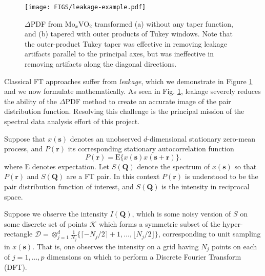 
\begin{figure} 
\begin{center}
    \texttt{[image: FIGS/leakage-example.pdf]} 
\end{center}
\caption{$\Delta$PDF from Mo$_x$VO$_2$ transformed (a) without any taper function,
and (b) tapered with outer products of Tukey windows. Note that the outer-product
Tukey taper was effective in removing leakage artifacts parallel to the principal
axes, but was ineffective in removing artifacts along the diagonal directions.
\label{fig:tapered}} 
\end{figure}

Classical FT approaches suffer from \textit{leakage}, which we demonstrate in Figure
\ref{fig:tapered} and we now formulate mathematically. As seen in Fig.
\ref{fig:tapered}, leakage severely reduces the ability of the $\Delta$PDF method to
create an accurate image of the pair distribution function. Resolving this challenge
is the principal mission of the spectral data analysis effort of this project. 

Suppose that $x(\mathbf{s})$ denotes an unobserved $d$-dimensional stationary
zero-mean process, and $P(\mathbf{r})$ its corresponding stationary autocorrelation
function 
\begin{equation}
P(\mathbf{r}) = \mbox{E} \{ x(\mathbf{s}) x(\mathbf{s} + \mathbf{r}) \}.
\end{equation} 
where E denotes expectation. Let $S(\mathbf{Q})$ denote the spectrum of
$x(\mathbf{s})$ so that $P(\mathbf{r})$ and $S(\mathbf{Q})$ are a FT pair. In this
context $P(\mathbf{r})$ is understood to be the pair distribution function of
interest, and $S(\mathbf{Q})$ is the intensity in reciprocal space.

Suppose we observe the intensity $I(\mathbf{Q})$, which is some noisy version of $S$
on some discrete set of points $\mathcal{K}$ which forms a symmetric subset of the
hyper-rectangle $\mathcal{D} = \otimes_{j = 1}^d \frac{1}{N_j} \{\lceil -N_j/2 \rceil
+ 1, \ldots, \lfloor N_j/2 \rfloor \}$, corresponding to unit sampling in
$x(\mathbf{s})$. That is, one observes the intensity on a grid having $N_j$ points on
each of $j = 1, \ldots, p$ dimensions on which to perform a Discrete Fourier
Transform (DFT). 

